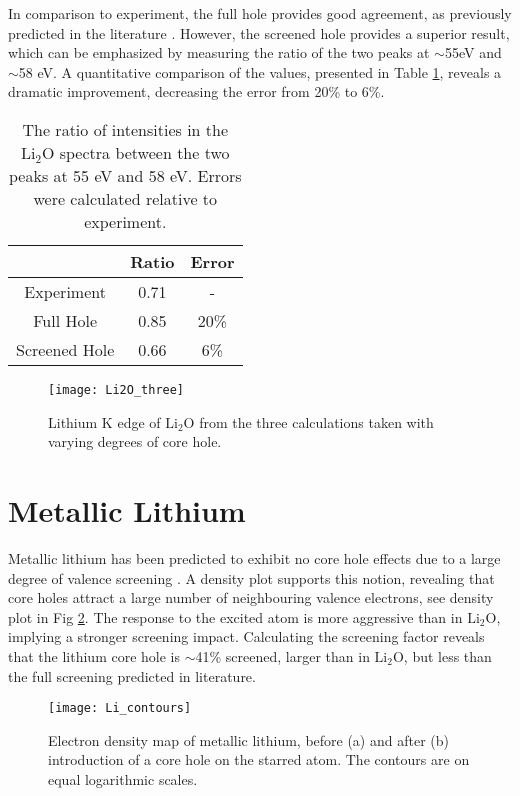 In comparison to experiment, the full hole provides good agreement, as previously predicted in the literature \cite{mauchamp_ab_2006}. However, the screened hole provides a superior result, which can be emphasized by measuring the ratio of the two peaks at $\sim$55eV and $\sim$58 eV.  A quantitative comparison of the values, presented in Table \ref{ratio}, reveals a dramatic improvement, decreasing the error from 20\% to  6\%.  

\begin{table}[H]
	\centering
		\caption{The ratio of intensities in the $\mathrm{Li_2O}$ spectra between the two peaks at 55 eV and 58 eV.  Errors were calculated relative to experiment.   }
	
	\begin{tabular}{ccc}
		& Ratio & Error \\
		\hline
		Experiment & 0.71 & -  \\
		Full Hole & 0.85 & 20\%  \\
		Screened Hole & 0.66 & 6\%  \\
		
	\end{tabular}
\label{ratio}
\end{table}




\begin{figure}
	\centering
	\texttt{[image: Li2O\_three]}
	\caption{Lithium K edge of $ \mathrm{Li_2O} $ from the three calculations taken with varying degrees of core hole. }
	\label{Li2O_three}
\end{figure}

\section{Metallic Lithium}
Metallic lithium has been predicted to exhibit no core hole effects due to a large degree of valence screening \cite{rez_theory_2008}. A density plot supports this notion, revealing that core  holes attract a large number of neighbouring valence electrons, see density plot in Fig \ref{Li_countours}.  The response to the excited atom is more aggressive than in $ \mathrm{Li_2O} $, implying a stronger screening impact.  Calculating the screening factor  reveals that the lithium core hole is  $ \sim$41\% screened, larger than in $ \mathrm{Li_2O} $, but less than the full screening predicted in literature. 
\\


\begin{figure}
	\centering
	\texttt{[image: Li\_contours]}
	\caption{Electron density map of metallic lithium, before (a) and after (b) introduction of a core hole on the starred atom.  The contours are on equal logarithmic scales.}
	\label{Li_countours}
\end{figure}




